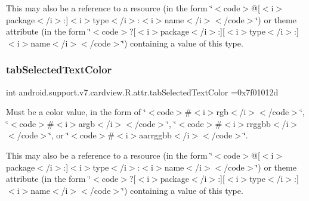 This may also be a reference to a resource (in the form \char`\"{}$<$code$>$@\mbox{[}$<$i$>$package$<$/i$>$\+:\mbox{]}$<$i$>$type$<$/i$>$\+:$<$i$>$name$<$/i$>$$<$/code$>$\char`\"{}) or theme attribute (in the form \char`\"{}$<$code$>$?\mbox{[}$<$i$>$package$<$/i$>$\+:\mbox{]}\mbox{[}$<$i$>$type$<$/i$>$\+:\mbox{]}$<$i$>$name$<$/i$>$$<$/code$>$\char`\"{}) containing a value of this type. \mbox{\label{classandroid_1_1support_1_1v7_1_1cardview_1_1R_1_1attr_a3ffecd1757b4e0a371094c0edb7234e3}} 
\subsubsection{\texorpdfstring{tab\+Selected\+Text\+Color}{tabSelectedTextColor}}
{\footnotesize\ttfamily int android.\+support.\+v7.\+cardview.\+R.\+attr.\+tab\+Selected\+Text\+Color =0x7f01012d\hspace{0.3cm}{\ttfamily [static]}}

Must be a color value, in the form of \char`\"{}$<$code$>$\#$<$i$>$rgb$<$/i$>$$<$/code$>$\char`\"{}, \char`\"{}$<$code$>$\#$<$i$>$argb$<$/i$>$$<$/code$>$\char`\"{}, \char`\"{}$<$code$>$\#$<$i$>$rrggbb$<$/i$>$$<$/code$>$\char`\"{}, or \char`\"{}$<$code$>$\#$<$i$>$aarrggbb$<$/i$>$$<$/code$>$\char`\"{}. 

This may also be a reference to a resource (in the form \char`\"{}$<$code$>$@\mbox{[}$<$i$>$package$<$/i$>$\+:\mbox{]}$<$i$>$type$<$/i$>$\+:$<$i$>$name$<$/i$>$$<$/code$>$\char`\"{}) or theme attribute (in the form \char`\"{}$<$code$>$?\mbox{[}$<$i$>$package$<$/i$>$\+:\mbox{]}\mbox{[}$<$i$>$type$<$/i$>$\+:\mbox{]}$<$i$>$name$<$/i$>$$<$/code$>$\char`\"{}) containing a value of this type. \mbox{\label{classandroid_1_1support_1_1v7_1_1cardview_1_1R_1_1attr_a991714806007fb1bbebad5f2c6fc6155}} 
